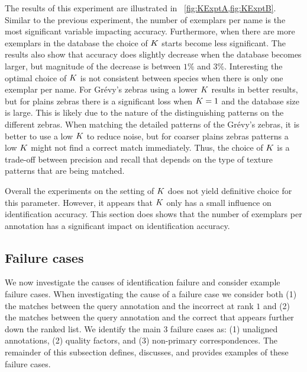         The results of this experiment are illustrated in ~\cref{fig:KExptA,fig:KExptB}. Similar to the previous
        experiment, the number of exemplars per name is the most significant variable impacting accuracy.
        Furthermore, when there are more exemplars in the database the choice of $K$ starts become less
        significant. The results also show that accuracy does slightly decrease when the database becomes larger,
        but magnitude of the decrease is between $1\percent$ and $3\percent$. Interesting the optimal choice of
        $K$ is not consistent between species when there is only one exemplar per name. For Grévy's zebras using a
        lower $K$ results in better results, but for plains zebras there is a significant loss when $K=1$ and the
        database size is large. This is likely due to the nature of the distinguishing patterns on the different
        zebras. When matching the detailed patterns of the Grévy's zebras, it is better to use a low $K$ to reduce
        noise, but for coarser plains zebras patterns a low $K$ might not find a correct match immediately. Thus,
        the choice of $K$ is a trade-off between precision and recall that depends on the type of texture patterns
        that are being matched.
        
        Overall the experiments on the setting of $K$ does not yield definitive choice for this parameter.
        However, it appears that $K$ only has a small influence on identification accuracy. This section does
        shows that the number of exemplars per annotation has a significant impact on identification accuracy.

        \KExptA{}
        \KExptB{}

    \FloatBarrier{}
    \subsection{Failure cases}\label{sub:exptfail}  
        
        We now investigate the causes of identification failure and consider example failure cases. When
        investigating the cause of a failure case we consider both (1) the matches between the query annotation and
        the incorrect \name{}  at rank $1$ and (2) the matches between the query annotation and the correct \name{}
        that appears further down the ranked list. We identify the main 3 failure cases as: (1) unaligned
        annotations, (2) quality factors, and (3) non-primary correspondences. The remainder of this subsection
        defines, discusses, and provides examples of these failure cases.

